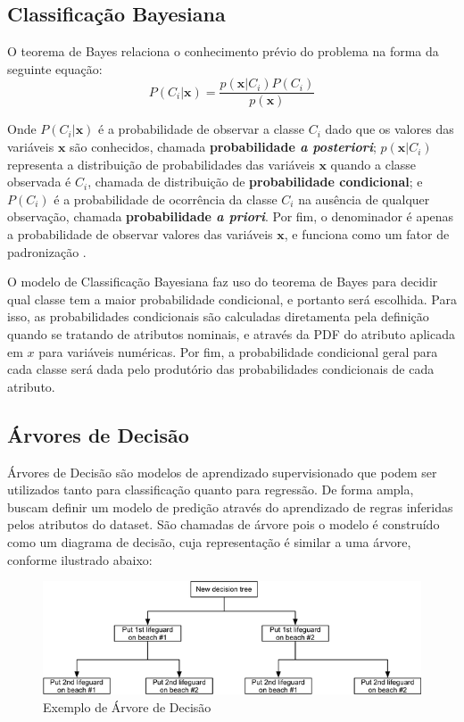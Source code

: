 \documentclass{homework}
\begin{document}
\subsection{Classificação Bayesiana}

O teorema de Bayes relaciona o conhecimento prévio do problema na forma da seguinte equação:
\begin{equation}
    P(C_i|\mathbf{x}) = \frac{p(\mathbf{x}|C_i)P(C_i)}{p(\mathbf{x})}
\end{equation}

Onde $P(C_i|\mathbf{x})$ é a probabilidade de observar a classe $C_i$ dado que os valores das variáveis $\mathbf{x}$ são
conhecidos, chamada \textbf{probabilidade \textit{a posteriori}}; $p(\mathbf{x}|C_i)$ representa a distribuição de
probabilidades das variáveis $\mathbf{x}$ quando a classe observada é $C_i$, chamada de distribuição de 
\textbf{probabilidade condicional}; e $P(C_i)$ é a probabilidade de ocorrência da classe $C_i$ na ausência de qualquer
observação, chamada \textbf{probabilidade \textit{a priori}}. Por fim, o denominador é apenas a probabilidade de
observar valores das variáveis $\mathbf{x}$, e funciona como um fator de padronização \cite{evsukoff}.

O modelo de Classificação Bayesiana faz uso do teorema de Bayes para decidir qual classe tem a maior probabilidade
condicional, e portanto será escolhida. Para isso, as probabilidades condicionais são calculadas diretamenta pela
definição quando se tratando de atributos nominais, e através da PDF do atributo aplicada em $x$ para variáveis
numéricas. Por fim, a probabilidade condicional geral para cada classe será dada pelo produtório das probabilidades
condicionais de cada atributo.

\subsection{Árvores de Decisão}
\label{dt}

Árvores de Decisão são modelos de aprendizado supervisionado que podem ser utilizados tanto para classificação quanto
para regressão. De forma ampla, buscam definir um modelo de predição através do aprendizado de regras inferidas pelos
atributos do dataset. São chamadas de árvore pois o modelo é construído como um diagrama de decisão, cuja representação
é similar a uma árvore, conforme ilustrado abaixo:

\begin{figure}[h!]
    \centerline{\includegraphics[scale=2]{decision_tree.png}}
    \label{decision_tree}
    \caption{Exemplo de Árvore de Decisão \cite{decision_tree}}
\end{figure}
\end{document}
